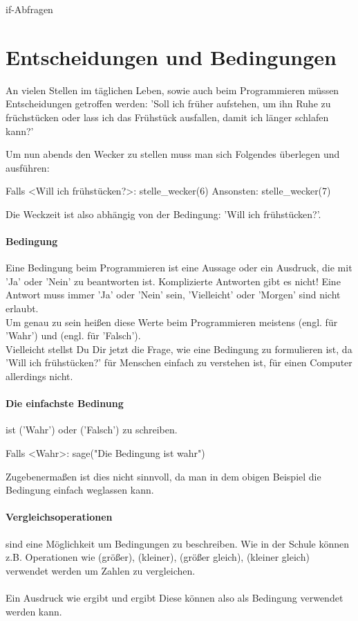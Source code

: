 \documentclass{\VorlagenPfad/coderdojokatext}
\newcommand{\Titel}{if-Abfragen}
\begin{document}
\begin{center}
	{\huge \Titel}
\end{center}

\section{Entscheidungen und Bedingungen}
An vielen Stellen im täglichen Leben, sowie auch beim Programmieren müssen Entscheidungen getroffen werden:
'Soll ich früher aufstehen, um ihn Ruhe zu früchstücken oder lass ich das Frühstück ausfallen, damit ich länger schlafen kann?'
	
Um nun abends den Wecker zu stellen muss man sich Folgendes überlegen und ausführen:


\begin{pseudocode}
Falls <Will ich frühstücken?>:
	stelle_wecker(6)
Ansonsten:
	stelle_wecker(7)
\end{pseudocode}

Die Weckzeit ist also abhängig von der Bedingung: 'Will ich frühstücken?'.

\paragraph{Bedingung} Eine Bedingung beim Programmieren ist eine Aussage oder ein Ausdruck,
die mit 'Ja' oder 'Nein' zu beantworten ist. Komplizierte Antworten gibt es nicht! Eine Antwort
muss immer 'Ja' oder 'Nein' sein, 'Vielleicht' oder 'Morgen' sind nicht erlaubt.
\\
Um genau zu sein heißen diese Werte beim Programmieren meistens  (engl. für 'Wahr') und  (engl. für 'Falsch').
\\
Vielleicht stellst Du Dir jetzt die Frage, wie eine Bedingung zu formulieren ist, da 'Will ich frühstücken?' für Menschen einfach zu verstehen ist, für einen Computer allerdings nicht.

\paragraph{Die einfachste Bedinung} ist ('Wahr') oder  ('Falsch') zu schreiben.
\begin{pseudocode}
Falls <Wahr>:
	sage("Die Bedingung ist wahr")
\end{pseudocode}
Zugebenermaßen ist dies nicht sinnvoll, da man in dem obigen Beispiel die Bedingung einfach weglassen kann.
	
\paragraph{Vergleichsoperationen} sind eine Möglichkeit um Bedingungen zu beschreiben. Wie in der Schule können z.B. Operationen wie \code{>} (größer), \code{<} (kleiner),\code{>=} (größer gleich), \code{<=} (kleiner gleich) verwendet werden um Zahlen zu vergleichen.
\\
\\
Ein Ausdruck wie  ergibt  und  ergibt  Diese können also als Bedingung verwendet werden kann.
\end{document}
